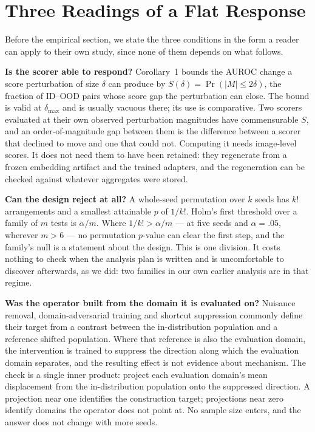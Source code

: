 \documentclass[11pt,a4paper]{article}
\begin{document}
\section{Three Readings of a Flat Response}
\label{sec:three}
Before the empirical section, we state the three conditions in the form a
reader can apply to their own study, since none of them depends on what
follows.

\textbf{Is the scorer able to respond?} Corollary~1 bounds the AUROC change a
score perturbation of size $\delta$ can produce by $S(\delta)=\Pr(|M|\le
2\delta)$, the fraction of ID--OOD pairs whose score gap the perturbation can
close. The bound is valid at $\delta_{\max}$ and is usually vacuous there; its
use is comparative. Two scorers evaluated at their own observed perturbation
magnitudes have commensurable $S$, and an order-of-magnitude gap between them
is the difference between a scorer that declined to move and one that could not.
Computing it needs image-level scores. It does not need them to have been
retained: they regenerate from a frozen embedding artifact and the trained
adapters, and the regeneration can be checked against whatever aggregates were
stored.

\textbf{Can the design reject at all?} A whole-seed permutation over $k$ seeds
has $k!$ arrangements and a smallest attainable $p$ of $1/k!$. Holm's first
threshold over a family of $m$ tests is $\alpha/m$. Where $1/k! > \alpha/m$ ---
at five seeds and $\alpha=.05$, wherever $m>6$ --- no permutation $p$-value can
clear the first step, and the family's null is a statement about the design.
This is one division. It costs nothing to check when the analysis plan is
written and is uncomfortable to discover afterwards, as we did: two families in
our own earlier analysis are in that regime.

\textbf{Was the operator built from the domain it is evaluated on?} Nuisance
removal, domain-adversarial training and shortcut suppression commonly define
their target from a contrast between the in-distribution population and a
reference shifted population. Where that reference is also the evaluation
domain, the intervention is trained to suppress the direction along which the
evaluation domain separates, and the resulting effect is not evidence about
mechanism. The check is a single inner product: project each evaluation
domain's mean displacement from the in-distribution population onto the
suppressed direction. A projection near one identifies the construction target;
projections near zero identify domains the operator does not point at. No
sample size enters, and the answer does not change with more seeds.
\end{document}
